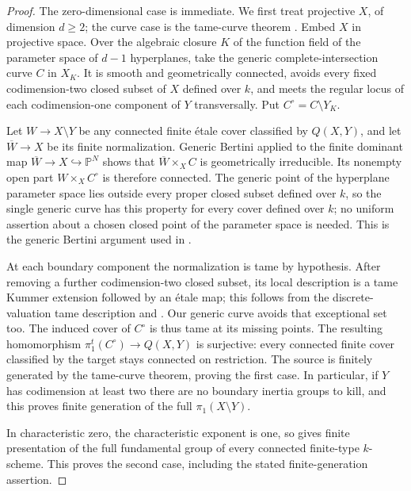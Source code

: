 \begin{proof}
The zero-dimensional case is immediate. We first treat projective $X$,
of dimension $d\geq2$; the curve case
is the tame-curve theorem \cite[XIII, Corollary 2.12, pp. 392--393]{SGA1}.
Embed $X$ in projective space. Over the algebraic closure $K$ of the
function field of the parameter space of $d-1$ hyperplanes, take the
generic complete-intersection curve $C$ in $X_K$. It is smooth and
geometrically connected, avoids every fixed codimension-two closed
subset of $X$ defined over $k$, and meets the regular locus of each
codimension-one component of $Y$ transversally. Put $C^\circ=C\setminus Y_K$.

Let $W\to X\setminus Y$ be any connected finite \'etale cover
classified by $Q(X,Y)$, and let $\overline W\to X$ be its finite
normalization. Generic Bertini applied to the finite dominant map
$\overline W\to X\hookrightarrow\mathbb P^N$ shows that
$\overline W\times_X C$ is geometrically irreducible. Its nonempty
open part $W\times_XC^\circ$ is therefore connected. The generic
point of the hyperplane parameter space lies outside every proper
closed subset defined over $k$, so the single generic curve has this
property for every cover defined over $k$; no uniform assertion about
a chosen closed point of the parameter space is needed. This is the
generic Bertini argument used in
\cite[X, Lemma 2.10 and Corollary 2.11, p. 274]{SGA1}.

At each boundary component the normalization is tame by hypothesis.
After removing a further codimension-two closed subset, its local
description is a tame Kummer extension followed by an \'etale map;
this follows from the discrete-valuation tame description and
\cite[XIII, Proposition 5.2, pp. 428--429]{SGA1}.
Our generic curve avoids that exceptional set too. The induced cover
of $C^\circ$ is thus tame at its missing points. The resulting
homomorphism $\pi_1^t(C^\circ)\to Q(X,Y)$ is surjective: every
connected finite cover classified by the target stays connected on
restriction. The source is finitely generated by the tame-curve
theorem, proving the first case. In particular, if $Y$ has codimension
at least two there are no boundary inertia groups to kill, and this
proves finite generation of the full $\pi_1(X\setminus Y)$.

In characteristic zero, the characteristic exponent is one, so
\cite[Theorem 4.11, p. 143]{Orgogozo2003} gives finite presentation
of the full fundamental group of every connected finite-type
$k$-scheme. This proves the second case, including the stated
finite-generation assertion.


\end{proof}
